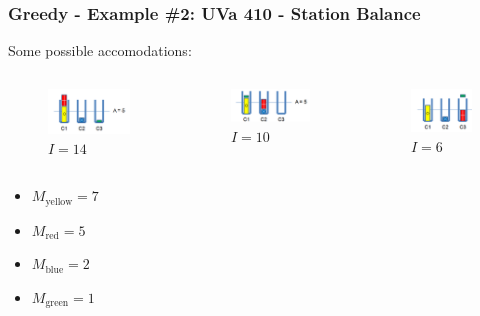 \documentclass{beamer}
\begin{document}
\begin{frame}[fragile]
\frametitle{Greedy - Example \#2: UVa 410 - Station Balance}

Some possible accomodations: 

\begin{columns}
	\begin{figure}
    	\centering
	    \includegraphics[scale=0.5]{imgs/uva_410_2.png}
    	\caption{$I = 14$}
	\end{figure}

	\begin{figure}
    	\centering
	    \includegraphics[scale=0.55]{imgs/uva_410_3.png}
    	\caption{$I = 10$}
	\end{figure}

	\begin{figure}
    	\centering
	    \includegraphics[scale=0.5]{imgs/uva_410_4.png}
    	\caption{$I = 6$}
	\end{figure}

\end{columns}

\begin{itemize}
	\item $M_\text{yellow} = 7$
	\item $M_\text{red} = 5$
	\item $M_\text{blue} = 2$
	\item $M_\text{green} = 1$			
\end{itemize}

\end{frame}
\end{document}
